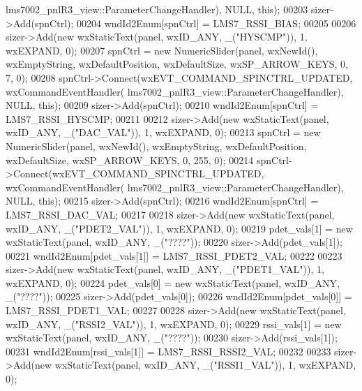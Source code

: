 \begin{DoxyCode}
      lms7002_pnlR3_view::ParameterChangeHandler), NULL, \textcolor{keyword}{this});
00203             sizer->Add(spnCtrl);
00204             wndId2Enum[spnCtrl] = LMS7_RSSI_BIAS;
00205 
00206             sizer->Add(\textcolor{keyword}{new} wxStaticText(panel, wxID\_ANY, \_(\textcolor{stringliteral}{"HYSCMP"})), 1, wxEXPAND, 0);
00207             spnCtrl = \textcolor{keyword}{new} NumericSlider(panel, wxNewId(), wxEmptyString, wxDefaultPosition, wxDefaultSize, 
      wxSP\_ARROW\_KEYS, 0, 7, 0);
00208             spnCtrl->Connect(wxEVT\_COMMAND\_SPINCTRL\_UPDATED, wxCommandEventHandler(
      lms7002_pnlR3_view::ParameterChangeHandler), NULL, \textcolor{keyword}{this});
00209             sizer->Add(spnCtrl);
00210             wndId2Enum[spnCtrl] = LMS7_RSSI_HYSCMP;
00211 
00212             sizer->Add(\textcolor{keyword}{new} wxStaticText(panel, wxID\_ANY, \_(\textcolor{stringliteral}{"DAC\_VAL"})), 1, wxEXPAND, 0);
00213             spnCtrl = \textcolor{keyword}{new} NumericSlider(panel, wxNewId(), wxEmptyString, wxDefaultPosition, wxDefaultSize, 
      wxSP\_ARROW\_KEYS, 0, 255, 0);
00214             spnCtrl->Connect(wxEVT\_COMMAND\_SPINCTRL\_UPDATED, wxCommandEventHandler(
      lms7002_pnlR3_view::ParameterChangeHandler), NULL, \textcolor{keyword}{this});
00215             sizer->Add(spnCtrl);
00216             wndId2Enum[spnCtrl] = LMS7_RSSI_DAC_VAL;
00217 
00218             sizer->Add(\textcolor{keyword}{new} wxStaticText(panel, wxID\_ANY, \_(\textcolor{stringliteral}{"PDET2\_VAL"})), 1, wxEXPAND, 0);
00219             pdet_vals[1] = \textcolor{keyword}{new} wxStaticText(panel, wxID\_ANY, \_(\textcolor{stringliteral}{"????"}));
00220             sizer->Add(pdet_vals[1]);
00221             wndId2Enum[pdet_vals[1]] = LMS7_RSSI_PDET2_VAL;
00222 
00223             sizer->Add(\textcolor{keyword}{new} wxStaticText(panel, wxID\_ANY, \_(\textcolor{stringliteral}{"PDET1\_VAL"})), 1, wxEXPAND, 0);
00224             pdet\_vals[0] = \textcolor{keyword}{new} wxStaticText(panel, wxID\_ANY, \_(\textcolor{stringliteral}{"????"}));
00225             sizer->Add(pdet\_vals[0]);
00226             wndId2Enum[pdet\_vals[0]] = LMS7_RSSI_PDET1_VAL;
00227 
00228             sizer->Add(\textcolor{keyword}{new} wxStaticText(panel, wxID\_ANY, \_(\textcolor{stringliteral}{"RSSI2\_VAL"})), 1, wxEXPAND, 0);
00229             rssi_vals[1] = \textcolor{keyword}{new} wxStaticText(panel, wxID\_ANY, \_(\textcolor{stringliteral}{"????"}));
00230             sizer->Add(rssi_vals[1]);
00231             wndId2Enum[rssi_vals[1]] = LMS7_RSSI_RSSI2_VAL;
00232 
00233             sizer->Add(\textcolor{keyword}{new} wxStaticText(panel, wxID\_ANY, \_(\textcolor{stringliteral}{"RSSI1\_VAL"})), 1, wxEXPAND, 0);

\end{DoxyCode}
